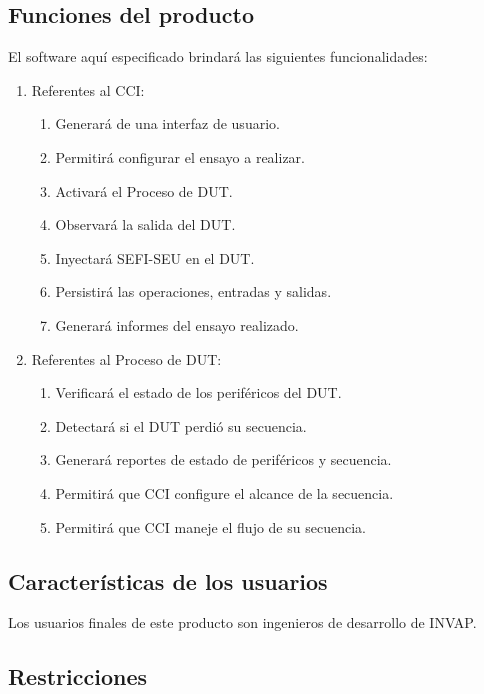 \documentclass[
11pt, %
codirector, %
]{charter}
\begin{document}
\subsection{Funciones del producto}
\label{sub:funcionesProducto}

El software aquí especificado brindará las siguientes funcionalidades:

\begin{enumerate}
	\item Referentes al CCI:
		\begin{enumerate}
			\item Generará de una interfaz de usuario.
			\item Permitirá configurar el ensayo a realizar.
			\item Activará el Proceso de DUT.
			\item Observará la salida del DUT.
			\item Inyectará SEFI-SEU en el DUT.
			\item Persistirá las operaciones, entradas y salidas.
			\item Generará informes del ensayo realizado.
		\end{enumerate}
	\item Referentes al Proceso de DUT:
		\begin{enumerate}
			\item Verificará el estado de los periféricos del DUT.
			\item Detectará si el DUT perdió su secuencia.
			\item Generará reportes de estado de periféricos y secuencia.
			\item Permitirá que CCI configure el alcance de la secuencia.
			\item Permitirá que CCI maneje el flujo de su secuencia.
		\end{enumerate}
\end{enumerate}

\subsection{Características de los usuarios}
\label{sub:usuarios}

Los usuarios finales de este producto son ingenieros de desarrollo de INVAP.

\subsection{Restricciones}
\label{sub:restricciones}
\end{document}
